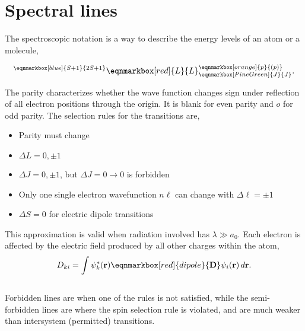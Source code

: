 \chapter{Spectral lines}
The spectroscopic notation is a way to describe the energy levels of an atom or a molecule,
\begin{definition}
\begin{equation}
  ^{\eqnmarkbox[blue]{S+1}{2S+1}}\eqnmarkbox[red]{L}{L}_{\eqnmarkbox[PineGreen]{J}{J}}^{\eqnmarkbox[orange]{p}{(p)}}.
\end{equation}
\end{definition}
The parity characterizes whether the wave function changes sign under reflection of all electron positions through the origin. It is blank for even parity and $o$ for odd parity. The selection rules for the transitions are, 
\begin{itemize}
  \item Parity must change 
  \item $\Delta L = 0, \pm 1$ 
  \item $\Delta J = 0, \pm 1$, but $\Delta J = 0\rightarrow 0$ is forbidden
  \item Only one single electron wavefunction $n\ell$ can change with $\Delta\ell = \pm 1$ 
  \item $\Delta S = 0$ for electric dipole transitions
\end{itemize} 
This approximation is valid when radiation involved has $\lambda\gg a_0$.
Each electron is affected by the electric field produced by all other charges within the atom, 
\begin{equation}
  D_{ki} = \int \psi^*_k(\mathbf{r})\eqnmarkbox[red]{dipole}{\mathbf{D}}\psi_i(\mathbf{r})\,d\mathbf{r}.
\end{equation}
\\

\vspace{-5mm}
\textsf{Forbidden lines} are when one of the rules is not satisfied, while the \textsf{semi-forbidden lines} are where the spin selection rule is violated, and are much weaker than intersystem (permitted) transitions.
